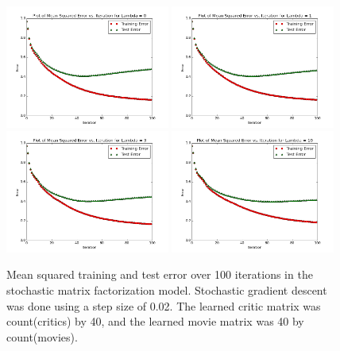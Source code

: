 \documentclass[12pt]{article}
\begin{document}
	\begin{figure}[H]
	\centering
	\includegraphics[width=0.48\textwidth]{plots/test-i100d40l0.png}
	\includegraphics[width=0.48\textwidth]{plots/test-i100d40l1.png}
	\includegraphics[width=0.48\textwidth]{plots/test-i100d40l3.png}
	\includegraphics[width=0.48\textwidth]{plots/test-i100d40l10.png}
	\caption{Mean squared training and test error over 100 iterations in the stochastic matrix factorization model. Stochastic gradient descent was done using a step size of 0.02. The learned critic matrix was count(critics) by 40, and the learned movie matrix was 40 by count(movies).}
	\label{fig:40}
	\end{figure}
\end{document}
